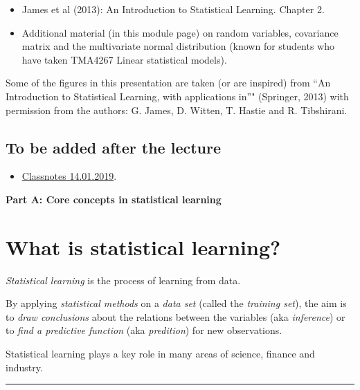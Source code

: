 \documentclass[]{article}
\providecommand{\tightlist}{%
  \setlength{\itemsep}{0pt}\setlength{\parskip}{0pt}}
\begin{document}
\begin{itemize}
\tightlist
\item
  James et al (2013): An Introduction to Statistical Learning. Chapter
  2.\\
\item
  Additional material (in this module page) on random variables,
  covariance matrix and the multivariate normal distribution (known for
  students who have taken TMA4267 Linear statistical models).
\end{itemize}

Some of the figures in this presentation are taken (or are inspired)
from ``An Introduction to Statistical Learning, with applications in''"
(Springer, 2013) with permission from the authors: G. James, D. Witten,
T. Hastie and R. Tibshirani.

\hypertarget{to-be-added-after-the-lecture}{%
\subsection{To be added after the
lecture}\label{to-be-added-after-the-lecture}}

\begin{itemize}
\tightlist
\item
  \href{https://www.math.ntnu.no/emner/TMA4268/2019v/notes/M2L1notes.pdf}{Classnotes
  14.01.2019}.
\end{itemize}

\large

\textbf{Part A: Core concepts in statistical learning}

\normalsize

\hypertarget{what-is-statistical-learning}{%
\section{What is statistical
learning?}\label{what-is-statistical-learning}}

\emph{Statistical learning} is the process of learning from data.

By applying \emph{statistical methods} on a \emph{data set} (called the
\emph{training set}), the aim is to \emph{draw conclusions} about the
relations between the variables (aka \emph{inference}) or to \emph{find
a predictive function} (aka \emph{predition}) for new observations.

Statistical learning plays a key role in many areas of science, finance
and industry.

\begin{center}\rule{0.5\linewidth}{\linethickness}\end{center}
\end{document}

